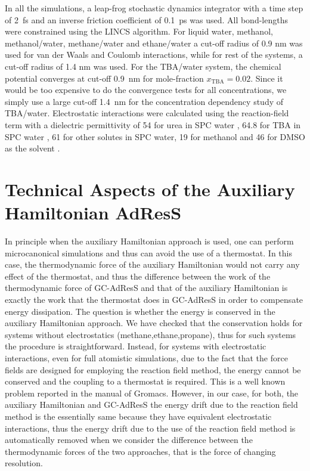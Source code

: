\documentclass[a4paper,preprint,unsortedaddress]{revtex4-1}
\newcommand{\concenttba}{x_{\textrm{TBA}}}
\begin{document}
In all the simulations, a leap-frog stochastic dynamics integrator with a time step
of 2~fs and an inverse friction coefficient of 0.1~ps was used. All bond-lengths were constrained using the LINCS 
algorithm.
For liquid water, methanol,
methanol/water, methane/water and ethane/water  a cut-off radius of
0.9 nm was used for van der Waals and Coulomb interactions, while for rest of the systems,
a cut-off radius of 1.4 nm was used.
{
  For the TBA/water system, the chemical potential converges at cut-off 0.9~nm for mole-fraction $\concenttba=0.02$.
  Since it would be too expensive to do the convergence tests for
  all concentrations, we simply use a large cut-off 1.4~nm for the concentration dependency study of TBA/water.}
Electrostatic interactions  were calculated using the reaction-field term \cite{rf} with a dielectric 
permittivity of 54 for urea in SPC water \cite{urea}, 64.8 for TBA in SPC water \cite{nico}, 61 for other solutes in SPC
water, 19 for methanol and 46 for DMSO as the solvent \cite{vang}.

\section{Technical Aspects of the Auxiliary Hamiltonian AdResS}\label{app:tmp2}
{In principle when the auxiliary Hamiltonian approach is used,
  one can perform microcanonical simulations and thus can avoid the
  use of a thermostat. In this case, the thermodynamic force of the
  auxiliary Hamiltonian would not carry any effect of the thermostat, and thus the difference between the work of the thermodynamic force of GC-AdResS and that of the auxiliary Hamiltonian is
  exactly the work that the thermostat does in GC-AdResS in order to compensate energy dissipation. The question is whether
  the energy is conserved in the auxiliary Hamiltonian approach. We
  have checked that the conservation holds for systems without
  electrostatics (methane,ethane,propane), thus for such systems the
  procedure is straightforward. Instead, for systems with
  electrostatic interactions, even for full atomistic simulations, due
  to the fact that the force fields are designed for employing the
  reaction field method, the energy cannot be conserved and the
  coupling to a thermostat is required. This is a well known problem
  reported in the manual of Gromacs. However, in our case, for both,
  the auxiliary Hamiltonian and GC-AdResS the energy drift due to the
  reaction field method is the essentially same because they have
  equivalent electrostatic interactions, thus the energy drift due to
  the use of the reaction field method is automatically removed when
  we consider the difference between the thermodynamic forces of the
  two approaches, that is the force of changing resolution.}
\end{document}
